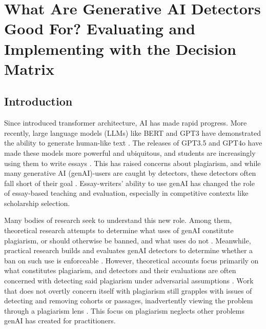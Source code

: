

\chapter{\label{ch:genai}What Are Generative AI Detectors Good For? Evaluating and Implementing with the Decision Matrix}

\minitoc

\section{Introduction}\label{sec:intro}
Since \textcite{ashish_vaswani_attention_2017} introduced transformer architecture, AI has made rapid progress. More recently, large language models (LLMs) like BERT and GPT3 have demonstrated the ability to generate human-like text \cite{jacob_devlin_bert_2018,brown_language_2020}. The releases of GPT3.5 and GPT4o have made these models more powerful and ubiquitous, and students are increasingly using them to write essays \cite{openai_gpt-4_2023,dehouche_plagiarism_2021}. This has raised concerns about plagiarism, and while many generative AI (genAI)-users are caught by detectors, these detectors often fall short of their goal \cite{liang_gpt_2023,kalpesh_krishna_paraphrasing_2023,mitchell_detectgpt_2023,tharindu_kumarage_stylometric_2023,dehouche_plagiarism_2021}. Essay-writers' ability to use genAI has changed the role of essay-based teaching and evaluation, especially in competitive contexts like scholarship selection.

Many bodies of research seek to understand this new role. Among them, theoretical research attempts to determine what uses of genAI constitute plagiarism, or should otherwise be banned, and what uses do not \cite{yu_huang_reflection_2023,mike_perkins_decoding_2023}. Meanwhile, practical research builds and evaluates genAI detectors to determine whether a ban on such use is enforceable \cite{mitchell_detectgpt_2023,tharindu_kumarage_stylometric_2023,kalpesh_krishna_paraphrasing_2023}. However, theoretical accounts focus primarily on what constitutes plagiarism, and detectors and their evaluations are often concerned with detecting said plagiarism under adversarial assumptions \cite{yu_huang_reflection_2023,kalpesh_krishna_paraphrasing_2023}. Work that does not overtly concern itself with plagiarism still grapples with issues of detecting and removing cohorts or passages, inadvertently viewing the problem through a plagiarism lens \cite{mitchell_detectgpt_2023,liang_gpt_2023}. This focus on plagiarism neglects other problems genAI has created for practitioners.

